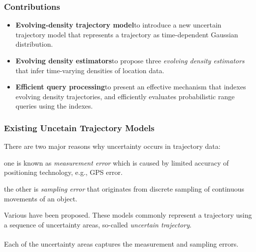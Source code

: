 
\begin{frame}
\frametitle{Contributions}

\begin{itemize}

  \item \textbf{Evolving-density trajectory model}\quad to introduce a new uncertain trajectory model that represents a trajectory as time-dependent Gaussian distribution.

  \item \textbf{Evolving density estimators}\quad to propose three \emph{evolving density estimators} that infer time-varying densities of location data.

  \item \textbf{Efficient query processing}\quad to present an effective mechanism that indexes evolving density trajectories, and efficiently evaluates probabilistic range queries using the indexes.

\end{itemize}

\end{frame}


\begin{frame}
\frametitle{Existing Uncetain Trajectory Models}

There are two major reasons why uncertainty occurs in trajectory data:~\cite{pfoser1999capturing}
\begin{fitemize}
  \item one is known as \emph{measurement error} which is caused by limited accuracy of positioning technology, e.g., GPS error.
  \item the other is \emph{sampling error} that originates from discrete sampling of continuous movements of an object.
\end{fitemize}

Various  have been proposed. These models commonly represent a trajectory using a sequence of uncertainty areas, so-called \emph{uncertain trajectory}.\\~\\

Each of the uncertainty areas captures the measurement and sampling errors.

\end{frame}

